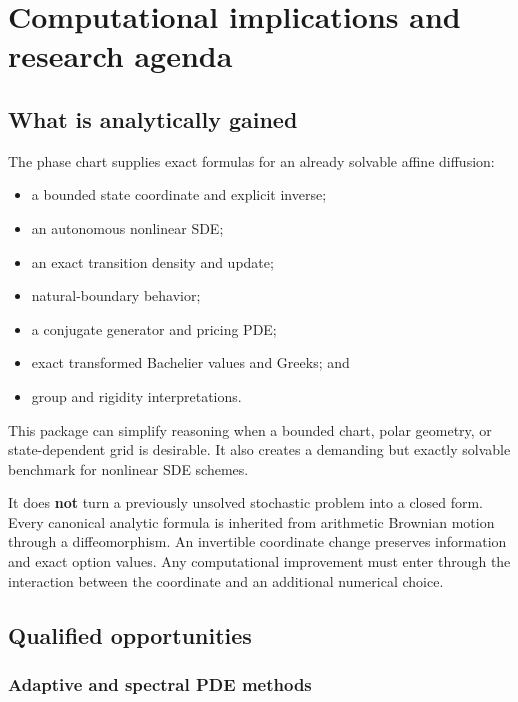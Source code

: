 \documentclass[
  english,
  10pt,
  letterpaper,
  DIV=11,
  numbers=noendperiod]{scrartcl}
\providecommand{\tightlist}{%
  \setlength{\itemsep}{0pt}\setlength{\parskip}{0pt}}
\theoremstyle{definition}
\theoremstyle{plain}
\theoremstyle{plain}
\theoremstyle{remark}
\begin{document}
\section{Computational implications and research
agenda}\label{sec-research-agenda}

\subsection{What is analytically
gained}\label{what-is-analytically-gained}

The phase chart supplies exact formulas for an already solvable affine
diffusion:

\begin{itemize}
\tightlist
\item
  a bounded state coordinate and explicit inverse;
\item
  an autonomous nonlinear SDE;
\item
  an exact transition density and update;
\item
  natural-boundary behavior;
\item
  a conjugate generator and pricing PDE;
\item
  exact transformed Bachelier values and Greeks; and
\item
  group and rigidity interpretations.
\end{itemize}

This package can simplify reasoning when a bounded chart, polar
geometry, or state-dependent grid is desirable. It also creates a
demanding but exactly solvable benchmark for nonlinear SDE schemes.

It does \textbf{not} turn a previously unsolved stochastic problem into
a closed form. Every canonical analytic formula is inherited from
arithmetic Brownian motion through a diffeomorphism. An invertible
coordinate change preserves information and exact option values. Any
computational improvement must enter through the interaction between the
coordinate and an additional numerical choice.

\subsection{Qualified opportunities}\label{qualified-opportunities}

\subsubsection{Adaptive and spectral PDE
methods}\label{adaptive-and-spectral-pde-methods}
\end{document}
